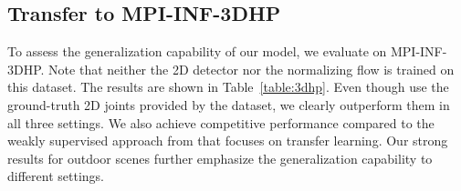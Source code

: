 \documentclass[10pt,twocolumn,letterpaper]{article}
\begin{document}
\begin{table}
	\begin{center}
		\caption{Evaluation results on the subset H36MA containing highly ambiguous examples.
			For each metric, the best hypothesis score is reported.}
		\vspace{-1.7em}
		\label{table:hardsubset}
	\end{center}
\end{table}


\subsection{Transfer to MPI-INF-3DHP}
To assess the generalization capability of our model, we evaluate on MPI-INF-3DHP.
Note that neither the 2D detector nor the normalizing flow is trained on this dataset. 
The results are shown in Table~\ref{table:3dhp}.
Even though \cite{Li_2019_CVPR} use the ground-truth 2D joints provided by the dataset, we clearly outperform them in all three settings.
We also achieve competitive performance compared to the weakly supervised approach from \cite{li2020weakly} that focuses on transfer learning.
Our strong results for outdoor scenes further emphasize the generalization capability to different settings.

\begin{table}
\begin{center}
    \caption{Quantitative results on MPI-INF-3DHP. 
    We outperform the approach from \cite{Li_2019_CVPR} by a large margin which even uses ground truth 2D joint positions. Note that \cite{li2020weakly} is trained weakly supervised and therefore specifically built for transfer learning. 
    However, we still achieve on par results and even outperform them in the challenging outdoor sequences.}
    \vspace{-1.5em}
    \label{table:3dhp}
\end{center}
\end{table}
\end{document}
